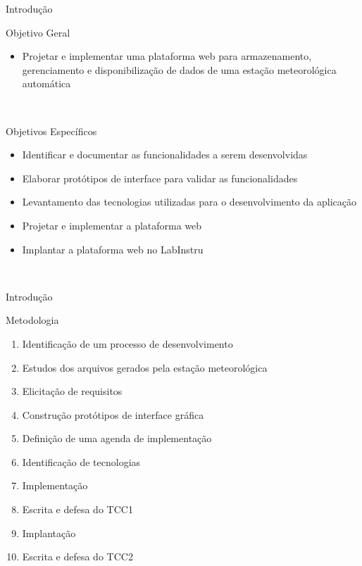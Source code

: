 \begin{frame}{Introdução}

\begin{block}{Objetivo Geral}
	\begin{itemize}
		\item Projetar e implementar uma plataforma web para armazenamento, gerenciamento e disponibilização de dados de uma estação meteorológica automática
	\end{itemize}
\end{block}
\ \ \newline

\begin{block}{Objetivos Específicos}
	\begin{itemize}
		\item Identificar e documentar as funcionalidades a serem desenvolvidas
		\item Elaborar protótipos de interface para validar as funcionalidades
		\item Levantamento das tecnologias utilizadas para o desenvolvimento da aplicação
		\item Projetar e implementar a plataforma web
		\item Implantar a plataforma web no LabInstru
	\end{itemize}
\end{block}
\ \ \newline

\end{frame}

\begin{frame}{Introdução}
\begin{block}{Metodologia}
	\begin{enumerate}
	\item Identificação de um processo de desenvolvimento
	\item Estudos dos arquivos gerados pela estação meteorológica
	\item Elicitação de requisitos
	\item Construção protótipos de interface gráfica
	\item Definição de uma agenda de implementação
	\item Identificação de tecnologias
	\item Implementação
	\item Escrita e defesa do TCC1
	\item Implantação
	\item Escrita e defesa do TCC2
\end{enumerate}
\end{block}


\end{frame}
